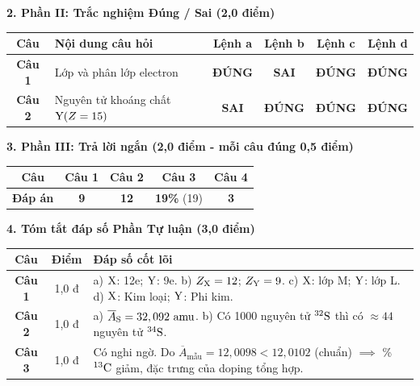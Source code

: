\documentclass[11pt,a4paper]{article}
\begin{document}
\vspace{2pt}
\noindent
\textbf{\color{mainGreen}2. Phần II: Trắc nghiệm Đúng / Sai (2,0 điểm)}
\begin{center}
\renewcommand{\arraystretch}{1.2}
\begin{tabular}{|c|l|c|c|c|c|}
\hline
\rowcolor{tableGreen}
\textbf{Câu} & \textbf{Nội dung câu hỏi} & \textbf{Lệnh a} & \textbf{Lệnh b} & \textbf{Lệnh c} & \textbf{Lệnh d} \\
\hline
\textbf{Câu 1} & Lớp và phân lớp electron & \textbf{\color{hfRed}ĐÚNG} & \textbf{SAI} & \textbf{\color{hfRed}ĐÚNG} & \textbf{\color{hfRed}ĐÚNG} \\
\hline
\textbf{Câu 2} & Nguyên tử khoáng chất $\ce{Y} (Z = 15)$ & \textbf{SAI} & \textbf{\color{hfRed}ĐÚNG} & \textbf{\color{hfRed}ĐÚNG} & \textbf{\color{hfRed}ĐÚNG} \\
\hline
\end{tabular}
\end{center}

\vspace{2pt}
\noindent
\textbf{\color{mainGreen}3. Phần III: Trả lời ngắn (2,0 điểm - mỗi câu đúng 0,5 điểm)}
\begin{center}
\renewcommand{\arraystretch}{1.2}
\begin{tabular}{|c|c|c|c|c|}
\hline
\rowcolor{tableGreen}
\textbf{Câu} & \textbf{Câu 1} & \textbf{Câu 2} & \textbf{Câu 3} & \textbf{Câu 4} \\
\hline
\textbf{Đáp án} & \textbf{\color{hfRed}9} & \textbf{\color{hfRed}12} & \textbf{\color{hfRed}19\%} (19) & \textbf{\color{hfRed}3} \\
\hline
\end{tabular}
\end{center}

\vspace{2pt}
\noindent
\textbf{\color{mainGreen}4. Tóm tắt đáp số Phần Tự luận (3,0 điểm)}
\begin{center}
\renewcommand{\arraystretch}{1.2}
\begin{tabular}{|c|c|p{11.5cm}|}
\hline
\rowcolor{tableGreen}
\textbf{Câu} & \textbf{Điểm} & \textbf{Đáp số cốt lõi} \\
\hline
\textbf{Câu 1} & 1,0 đ & a) $\ce{X}$: 12e; $\ce{Y}$: 9e. \quad b) $Z_{\ce{X}} = 12$; $Z_{\ce{Y}} = 9$. \quad c) $\ce{X}$: lớp M; $\ce{Y}$: lớp L. \quad d) $\ce{X}$: Kim loại; $\ce{Y}$: Phi kim. \\
\hline
\textbf{Câu 2} & 1,0 đ & a) $\overline{A}_{\ce{S}} = 32,092\text{ amu}$. \quad b) Có 1000 nguyên tử $^{32}\ce{S}$ thì có $\approx 44$ nguyên tử $^{34}\ce{S}$. \\
\hline
\textbf{Câu 3} & 1,0 đ & Có nghi ngờ. Do $\overline{A}_{\text{mẫu}} = 12,0098 < 12,0102$ (chuẩn) $\implies$ \% $^{13}\ce{C}$ giảm, đặc trưng của doping tổng hợp. \\
\hline
\end{tabular}
\end{center}
\end{document}
